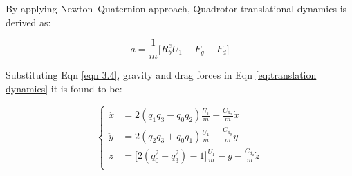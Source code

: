 By applying Newton--Quaternion approach, Quadrotor translational dynamics is derived as:
\begin{small}
\begin{equation}
    a = \frac{1}{m}\big[ R_b^{e} U_1 - F_g - F_d \big]
    \label{eq:translation dynamics}
\end{equation}

 Substituting Eqn \eqref{eqn 3.4}, gravity and drag forces  in Eqn \eqref{eq:translation dynamics} it is found to be:

 



\begin{equation}
\left\{
\begin{aligned}
\ddot{x} &= 2(q_1 q_3 - q_0 q_2)\frac{U_1}{m}
           - \frac{C_{d_x}}{m}\dot{x} \\
\ddot{y} &= 2(q_2 q_3 + q_0 q_1)\frac{U_1}{m}
           - \frac{C_{d_y}}{m}\dot{y}  \\
\ddot{z} &= \Big[2(q_0^2 + q_3^2)-1\Big]\frac{U_1}{m}
           - g - \frac{C_{d_z}}{m}\dot{z} \\
\end{aligned}
\right.
\end{equation}


\end{small}
